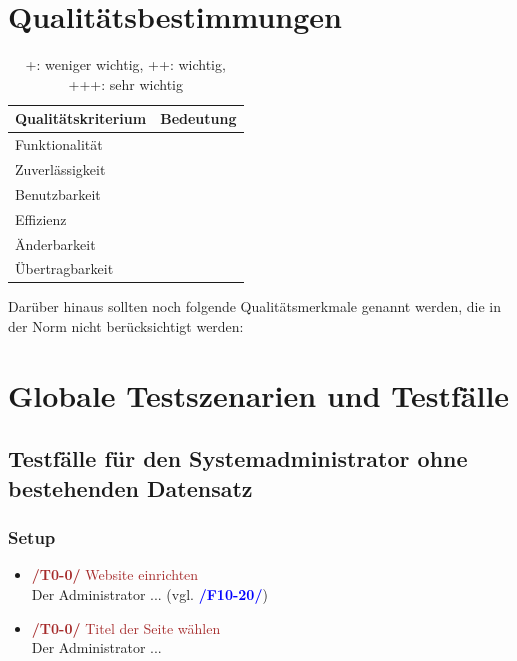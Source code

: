 \documentclass[a4paper]{scrreprt}
\newcounter{Lc}
\newcounter{Hc}
\newcommand{\resetAllCounter}{\setcounter{Lc}{0}\setcounter{Hc}{1}}
\begin{document}
\chapter{Qualitätsbestimmungen}

\begin{table}[h]
 
    \begin{center}
    \begin{tabular}{|l|c|}
    \hline 
    \rule[-1ex]{0pt}{2.5ex} \textbf{Qualitätskriterium} & \textbf{Bedeutung} \\ 
    \hline 
    \rule[-1ex]{0pt}{2.5ex} Funktionalität &  \\ 
    \hline 
    \rule[-1ex]{0pt}{2.5ex} Zuverlässigkeit &  \\ 
    \hline 
    \rule[-1ex]{0pt}{2.5ex} Benutzbarkeit &  \\ 
    \hline 
    \rule[-1ex]{0pt}{2.5ex} Effizienz &  \\ 
    \hline 
    \rule[-1ex]{0pt}{2.5ex} Änderbarkeit &  \\ 
    \hline 
    \rule[-1ex]{0pt}{2.5ex} Übertragbarkeit &  \\ 
    \hline   
    \end{tabular}  
    \end{center}
    \caption{+: weniger wichtig, ++: wichtig, +++: sehr wichtig} 
    \label{qTabelle}   
\end{table}
    
Darüber hinaus sollten noch folgende Qualitätsmerkmale genannt werden, die in der Norm nicht berücksichtigt werden:
 
\resetAllCounter
\newcommand{\Test}[1]{\stepcounter{Lc}\textcolor{Brown}{\textbf{/T\arabic{Hc}0-\arabic{Lc}0/} #1} \\}
\newcommand{\RefFuncBlue}[1]{\textcolor{Blue}{\textbf{#1}}}
\newcommand{\RefFuncGreen}[1]{\textcolor{Green}{\textbf{#1}}}
\chapter{Globale Testszenarien und Testfälle}
 

	\section{Testfälle für den Systemadministrator ohne bestehenden Datensatz}
		\subsection{Setup}
			\begin{itemize}
				\item \Test{Website einrichten} 
				Der Administrator ... (vgl. \RefFuncBlue{/F10-20/})		
				\item \Test{Titel der Seite wählen} 
				Der Administrator ... 		
			\end{itemize}			
\end{document}
